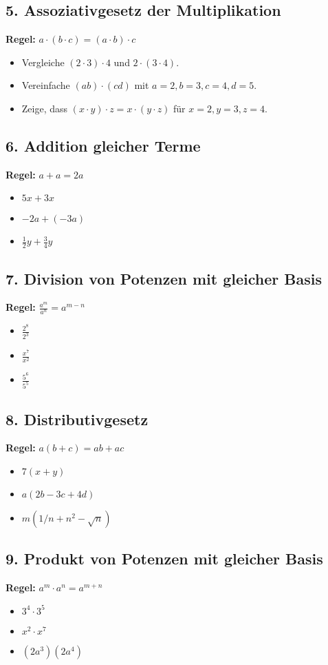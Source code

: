 \documentclass{article}
\begin{document}
\subsection*{5. Assoziativgesetz der Multiplikation}
\textbf{Regel:} \( a \cdot (b \cdot c) = (a \cdot b) \cdot c \)
\begin{itemize}
    \item Vergleiche \( (2 \cdot 3) \cdot 4 \) und \( 2 \cdot (3 \cdot 4) \).
    \item Vereinfache \( (ab) \cdot (cd) \) mit \( a = 2, b = 3, c = 4, d = 5 \).
    \item Zeige, dass \( (x \cdot y) \cdot z = x \cdot (y \cdot z) \) für \( x=2, y=3, z=4 \).
\end{itemize}

\subsection*{6. Addition gleicher Terme}
\textbf{Regel:} \( a + a = 2a \)
\begin{itemize}
    \item \( 5x + 3x \)
    \item \( -2a + (-3a) \)
    \item \( \frac{1}{2}y + \frac{3}{4}y \)
\end{itemize}

\subsection*{7. Division von Potenzen mit gleicher Basis}
\textbf{Regel:} \( \frac{a^m}{a^n} = a^{m-n} \)
\begin{itemize}
    \item \( \frac{2^8}{2^3} \)
    \item \( \frac{x^7}{x^2} \)
    \item \( \frac{5^6}{5^5} \)
\end{itemize}

\subsection*{8. Distributivgesetz}
\textbf{Regel:} \( a(b + c) = ab + ac \)
\begin{itemize}
    \item \( 7(x + y) \)
    \item \( a(2b - 3c + 4d) \)
    \item \( m(1/n + n^2 - \sqrt{n}) \)
\end{itemize}

\subsection*{9. Produkt von Potenzen mit gleicher Basis}
\textbf{Regel:} \( a^m \cdot a^n = a^{m+n} \)
\begin{itemize}
    \item \( 3^4 \cdot 3^5 \)
    \item \( x^2 \cdot x^7 \)
    \item \( (2a^3)(2a^4) \)
\end{itemize}
\end{document}
